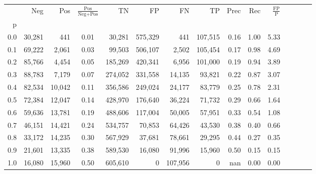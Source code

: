 \begin{tabular}{rrrcrrrrrrrrrrr}
\toprule
{} &     Neg &     Pos & $\frac{\text{Pos}}{\text{Neg}+\text{Pos}}$ &       TN &       FP &       FN &       TP &  Prec &   Rec & $\frac{\text{FP}}{\text{P}}$ \\
p   &         &         &                                            &          &          &          &          &       &       &                              \\
\midrule
0.0 &  30,281 &     441 &                                       0.01 &   30,281 &  575,329 &      441 &  107,515 &  0.16 &  1.00 &                         5.33 \\
0.1 &  69,222 &   2,061 &                                       0.03 &   99,503 &  506,107 &    2,502 &  105,454 &  0.17 &  0.98 &                         4.69 \\
0.2 &  85,766 &   4,454 &                                       0.05 &  185,269 &  420,341 &    6,956 &  101,000 &  0.19 &  0.94 &                         3.89 \\
0.3 &  88,783 &   7,179 &                                       0.07 &  274,052 &  331,558 &   14,135 &   93,821 &  0.22 &  0.87 &                         3.07 \\
0.4 &  82,534 &  10,042 &                                       0.11 &  356,586 &  249,024 &   24,177 &   83,779 &  0.25 &  0.78 &                         2.31 \\
0.5 &  72,384 &  12,047 &                                       0.14 &  428,970 &  176,640 &   36,224 &   71,732 &  0.29 &  0.66 &                         1.64 \\
0.6 &  59,636 &  13,781 &                                       0.19 &  488,606 &  117,004 &   50,005 &   57,951 &  0.33 &  0.54 &                         1.08 \\
0.7 &  46,151 &  14,421 &                                       0.24 &  534,757 &   70,853 &   64,426 &   43,530 &  0.38 &  0.40 &                         0.66 \\
0.8 &  33,172 &  14,235 &                                       0.30 &  567,929 &   37,681 &   78,661 &   29,295 &  0.44 &  0.27 &                         0.35 \\
0.9 &  21,601 &  13,335 &                                       0.38 &  589,530 &   16,080 &   91,996 &   15,960 &  0.50 &  0.15 &                         0.15 \\
1.0 &  16,080 &  15,960 &                                       0.50 &  605,610 &        0 &  107,956 &        0 &   nan &  0.00 &                         0.00 \\
\bottomrule
\end{tabular}
